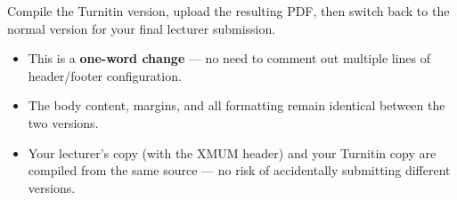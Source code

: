 Compile the Turnitin version, upload the resulting PDF, then switch back
to the normal version for your final lecturer submission.

\begin{itemize}
    \item This is a \textbf{one-word change} — no need to comment out
          multiple lines of header/footer configuration.
    \item The body content, margins, and all formatting remain identical
          between the two versions.
    \item Your lecturer's copy (with the XMUM header) and your Turnitin
          copy are compiled from the same source — no risk of accidentally
          submitting different versions.
\end{itemize}
